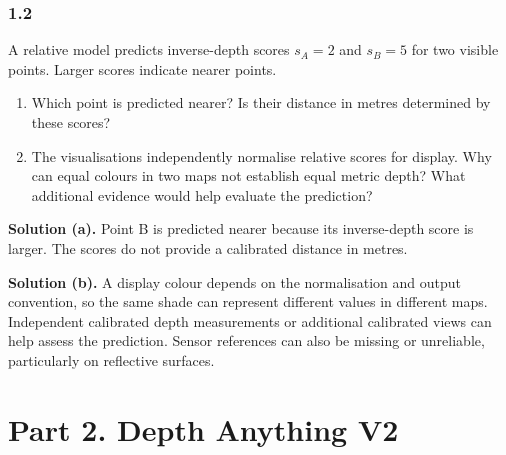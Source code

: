 \documentclass[11pt,a4paper]{article}
\begin{document}
\begin{minipage}{\linewidth}
\subsubsection*{1.2}
A relative model predicts inverse-depth scores $s_A=2$ and $s_B=5$ for two visible points.
Larger scores indicate nearer points.
\begin{enumerate}[label=(\alph*),nosep]
\item Which point is predicted nearer?
Is their distance in metres determined by these scores?
\item The visualisations independently normalise relative scores for display.
Why can equal colours in two maps not establish equal metric depth?
What additional evidence would help evaluate the prediction?
\end{enumerate}
\ifsolutions
\noindent\textbf{Solution (a).}
Point B is predicted nearer because its inverse-depth score is larger.
The scores do not provide a calibrated distance in metres.

\noindent\textbf{Solution (b).}
A display colour depends on the normalisation and output convention, so the same shade can represent different values in different maps.
Independent calibrated depth measurements or additional calibrated views can help assess the prediction.
Sensor references can also be missing or unreliable, particularly on reflective surfaces.
\fi
\end{minipage}
\par\medskip
{}
\section*{Part 2. Depth Anything V2}
\end{document}
